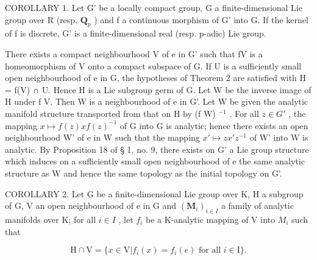 COROLLARY 1. Let G' be a locally compact group, G a finite-dimensional Lie group over R (resp. \(\mathbf{Q}_{p}\) ) and f a continuous morphism of G' into G. If the kernel of f is discrete, G' is a finite-dimensional real (resp. p-adic) Lie group.

There exists a compact neighbourhood V of e in G' such that f\textbar V is a homeomorphism of V onto a compact subspace of G. If U is a sufficiently small open neighbourhood of e in G, the hypotheses of Theorem 2 are satisfied with H = f(V) ∩ U. Hence H is a Lie subgroup germ of G. Let W be the inverse image of H under f \textbar{} V. Then W is a neighbourhood of e in G'. Let W be given the analytic manifold structure transported from that on H by (f \textbar{} W) \(^{-1}\) . For all \(z \in G'\) , the mapping \(x \mapsto f(z)xf(z)^{-1}\) of G into G is analytic; hence there exists an open neighbourhood W' of e in W such that the mapping \(x' \mapsto zx'z^{-1}\) of W' into W is analytic. By Proposition 18 of § 1, no. 9, there exists on G' a Lie group structure which induces on a sufficiently small open neighbourhood of e the same analytic structure as W and hence the same topology as the initial topology on G'.

COROLLARY 2. Let G be a finite-dimensional Lie group over K, H a subgroup of G, V an open neighbourhood of e in G and \((\mathbf{M}_{i})_{i\in I}\) a family of analytic manifolds over K; for all \(i\in I\) , let \(f_{i}\) be a K-analytic mapping of V into \(M_{i}\) such that

\[
\mathrm{H} \cap \mathrm{V} = \{x \in \mathrm{V} | f _ {i} (x) = f _ {i} (e) \text {   for   all   } i \in \mathrm{I} \}.
\]

